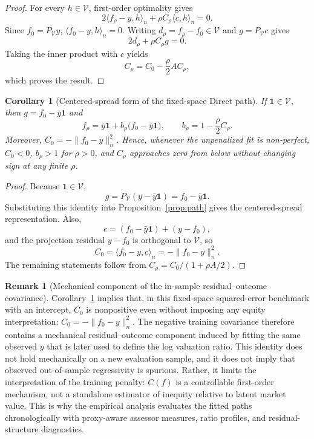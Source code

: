 \documentclass[10pt]{article}
\newtheorem{corollary}{Corollary}
\theoremstyle{definition}
\newtheorem{remark}{Remark}
\newcommand{\1}{\mathbf{1}}
\newcommand{\Vcal}{\mathcal{V}}
\newcommand{\newtext}[1]{\textcolor{impGreen}{#1}}
\begin{document}
\begin{proof}
For every $h\in\Vcal$, first-order optimality gives
\[
2\langle f_\rho-y,h\rangle_n
+\rho C_\rho\langle c,h\rangle_n=0.
\]
Since $f_0=P_{\Vcal}y$, $\langle f_0-y,h\rangle_n=0$. Writing
$d_\rho=f_\rho-f_0\in\Vcal$ and $g=P_{\Vcal}c$ gives
\[
2d_\rho+\rho C_\rho g=0.
\]
Taking the inner product with $c$ yields
\[
C_\rho=C_0-\frac{\rho}{2}AC_\rho,
\]
which proves the result.
\end{proof}

{\color{impGreen}
\begin{corollary}[Centered-spread form of the fixed-space Direct path]
\label{cor:path_scaling}
If $\1\in\Vcal$, then $g=f_0-\bar y\1$ and
\[
f_\rho
=
\bar y\1
+
b_\rho\bigl(f_0-\bar y\1\bigr),
\qquad
b_\rho
=
1-\frac{\rho}{2}C_\rho.
\]
Moreover, $C_0=-\|f_0-y\|_n^2$. Hence, whenever the unpenalized fit is non-perfect, $C_0<0$, $b_\rho>1$ for $\rho>0$, and $C_\rho$ approaches zero from below without changing sign at any finite $\rho$.
\end{corollary}

\begin{proof}
Because $\1\in\Vcal$,
\[
g=P_{\Vcal}(y-\bar y\1)=f_0-\bar y\1.
\]
Substituting this identity into Proposition~\ref{prop:path} gives the centered-spread representation. Also,
\[
c=(f_0-\bar y\1)+(y-f_0),
\]
and the projection residual $y-f_0$ is orthogonal to $\Vcal$, so
\[
C_0
=
\langle f_0-y,c\rangle_n
=
-\|f_0-y\|_n^2.
\]
The remaining statements follow from $C_\rho=C_0/(1+\rho A/2)$.
\end{proof}

\begin{remark}[Mechanical component of the in-sample residual--outcome covariance]
\label{rem:mechanical_covariance}
\newtext{Corollary~\ref{cor:path_scaling} implies that, in this fixed-space squared-error benchmark with an intercept, $C_0$ is nonpositive even without imposing any equity interpretation: $C_0=-\|f_0-y\|_n^2$. The negative training covariance therefore contains a mechanical residual--outcome component induced by fitting the same observed $y$ that is later used to define the log valuation ratio. This identity does not hold mechanically on a new evaluation sample, and it does not imply that observed out-of-sample regressivity is spurious. Rather, it limits the interpretation of the training penalty: $C(f)$ is a controllable first-order mechanism, not a standalone estimator of inequity relative to latent market value. This is why the empirical analysis evaluates the fitted paths chronologically with proxy-aware assessor measures, ratio profiles, and residual-structure diagnostics.}
\end{remark}

}
\end{document}
